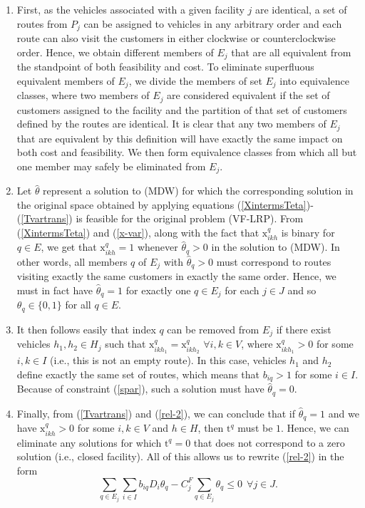 \documentclass[graybox]{./styles/svmult}
\begin{document}
\begin{enumerate}
\item 
First, as the vehicles associated with a given facility $j$ are
identical, a set of routes from $P_j$ can be assigned to vehicles in
any arbitrary order and each route can also visit the customers in
either clockwise or counterclockwise order. Hence, we obtain
different members of $E_j$ that are all equivalent from the standpoint
of both feasibility and cost.
To eliminate superfluous equivalent members of $E_j$, we divide the
members of set $E_j$ into equivalence classes, where two members of
$E_j$ are considered equivalent if the set of customers assigned to
the facility and the partition of that set of customers defined by the
routes are identical. It is clear that any two members of $E_j$ that
are equivalent by this definition will have exactly the same impact on
both cost and feasibility. We then form equivalence classes from which
all but one member may safely be eliminated from $E_j$.

\item Let $\hat{\theta}$ represent a solution to (MDW) for which the
  corresponding solution in the original space obtained by applying
  equations (\ref{XintermsTeta})-(\ref{Tvartrans}) is feasible for the
  original problem (VF-LRP). From (\ref{XintermsTeta}) and
  (\ref{x-var}), along with the fact that $\mbox{x}^q_{ikh}$ is binary
  for $q \in E$, we get that $\mbox{x}^q_{ikh} = 1$ whenever
  $\hat{\theta}_q > 0$ in the solution to (MDW). In other words, all
  members $q$ of $E_j$ with $\hat{\theta}_q > 0$ must correspond to
  routes visiting exactly the same customers in exactly the same
  order. Hence, we must in fact have $\hat{\theta}_q = 1$ for exactly
  one $q \in E_j$ for each $j \in J$ and so $\theta_q \in \{0, 1\}$
  for all $q \in E$.
\item It then follows easily that index $q$ can be removed from $E_j$
if there exist vehicles $h_1, h_2 \in H_j$ such that
$\mbox{x}_{ikh_1}^q = \mbox{x}_{ikh_2}^q$ $\forall i, k \in V$, where
$\mbox{x}_{ikh_1}^q>0$ for some $i, k \in I$ (i.e., this is not an
empty route). In this case, vehicles $h_1$ and $h_2$ define exactly
the same set of routes, which means that $b_{iq}> 1$ for some $i \in
I$. Because of constraint (\ref{spar}), such a solution must have
$\hat{\theta}_q=0$.
\item Finally, from (\ref{Tvartrans}) and (\ref{rel-2}), we can
  conclude that if $\hat{\theta}_q =1$ and we have $\mbox{x}_{ikh}^q>0$
  for some $i, k \in V$ and $h \in H$, then $\mbox{t}^q$ must be $1$.
  Hence, we can eliminate any solutions for which $\mbox{t}^q = 0$
  that does not correspond to a zero solution (i.e., closed facility).
  All of this allows us to rewrite (\ref{rel-2}) in the form
\begin{equation}
\sum_{q \in E_j} \sum_{i \in I} b_{iq} D_i \theta_q  -
C^F_j \sum_{q \in E_j} \theta_q \leq 0 \ \ \forall j \in J. \label{rel-2-new}
\end{equation}
\end{enumerate}   
\end{document}
